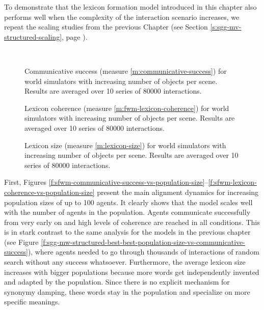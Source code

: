 To demonstrate that the lexicon formation model introduced in this
chapter also performs well when the complexity of the interaction
scenario increases, we repeat the scaling studies from the previous
Chapter (see Section \ref{s:sgg-mv-structured-scaling}, page
\pageref{s:sgg-mv-structured-scaling}).

~\\



\startfiguregroup

\begin{figure}[p]
  \caption{Communi\-cative success (measure
    \ref{m:communicative-success}) for world simulators with
    increasing number of objects per scene. Results are averaged over
    10 series of 80000 interactions. }
  \label{f:sfwm-context-size-vs-communicative-success}
\end{figure}


\begin{figure}[p]
  \caption{Lexicon coherence (measure \ref{m:fwm-lexicon-coherence})
    for world simulators with increasing number of objects per
    scene. Results are averaged over 10 series of 80000
    interactions. }
  \label{f:sfwm-context-size-vs-lexicon-coherence}
\end{figure}


\begin{figure}[p]
  \caption{Lexicon size (measure \ref{m:lexicon-size})
    for world simulators with increasing number of objects per
    scene. Results are averaged over 10 series of 80000
    interactions. }
  \label{f:sfwm-context-size-vs-lexicon-size}
\end{figure}

\stopfiguregroup

\noindent First, Figures
\ref{f:sfwm-communicative-success-vs-population-size}--\ref{f:sfwm-lexicon-coherence-vs-population-size}
present the main alignment dynamics for increasing population sizes of
up to 100 agents. It clearly shows that the model scales well with the
number of agents in the population. Agents communicate successfully
from very early on and high levels of coherence are reached in all
conditions. This is in stark contrast to the same analysis for the
models in the previous chapter (see Figure
\ref{f:sgg-mw-structured-best-best-population-size-vs-communicative-success}),
where agents needed to go through thousands of interactions of random
search without any success whatsoever. Furthermore, the average
lexicon size increases with bigger populations because more words get
independently invented and adapted by the population. Since there is
no explicit mechanism for synonymy damping, these words stay in the
population and specialize on more specific meanings.


